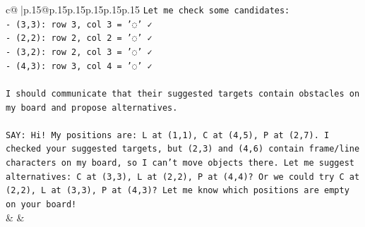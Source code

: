 \documentclass{article}
\begin{document}
{\begin{supertabular}{c@{$\;$}|p{.15\linewidth}@{}p{.15\linewidth}p{.15\linewidth}p{.15\linewidth}p{.15\linewidth}p{.15\linewidth}}
{{{\texttt{Let me check some candidates:} \\
\texttt{{-} (3,3): row 3, col 3 = '◌' ✓} \\
\texttt{{-} (2,2): row 2, col 2 = '◌' ✓} \\
\texttt{{-} (3,2): row 2, col 3 = '◌' ✓} \\
\texttt{{-} (4,3): row 3, col 4 = '◌' ✓} \\
\\ 
\texttt{I should communicate that their suggested targets contain obstacles on my board and propose alternatives.} \\
\\ 
\texttt{SAY: Hi! My positions are: L at (1,1), C at (4,5), P at (2,7). I checked your suggested targets, but (2,3) and (4,6) contain frame/line characters on my board, so I can't move objects there. Let me suggest alternatives: C at (3,3), L at (2,2), P at (4,4)? Or we could try C at (2,2), L at (3,3), P at (4,3)? Let me know which positions are empty on your board!} \\
            }
        }
    }
    & & \\ \\


\end{supertabular}}
\end{document}
